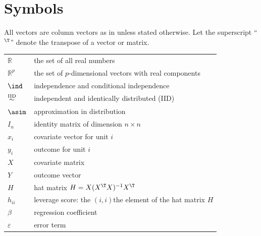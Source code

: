 \chapter*{Symbols}


All vectors are column vectors as in   unless stated otherwise. Let the superscript ``$^{\T}$''
denote the transpose of a vector or matrix. 


\begin{tabular}{ll}
$\mathbb{R}$ & the set of all real numbers \\ 
$\mathbb{R}^p$ & the set of $p$-dimensional vectors with real components \\ 
$\ind$& independence and conditional independence\\ 
$\stackrel{\textup{IID}}{\sim}$ & independent and identically distributed (IID)\\
$\asim$ & approximation in distribution \\ 
$I_n$ & identity matrix of dimension $n\times n$\\ 
$x_i$ & covariate vector for unit $i$ \\
$y_i$ & outcome for unit $i$ \\
$X$ & covariate matrix \\
$Y$ & outcome vector \\
$H$ & hat matrix $H = X(X^{\T}X)^{-1}X^{\T}$\\ 
$h_{ii}$ & leverage score: the $(i, i)$the element of the hat matrix $H$ \\
$\beta$ & regression coefficient\\
$\varepsilon$ & error term 
\end{tabular}